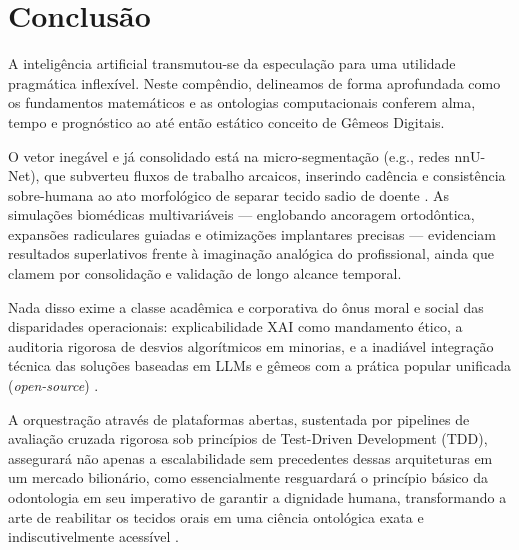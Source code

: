 \section{Conclusão}
\label{sec:ia-conclusão}

A inteligência artificial transmutou-se da especulação para uma utilidade pragmática inflexível. Neste compêndio, delineamos de forma aprofundada como os fundamentos matemáticos e as ontologias computacionais conferem alma, tempo e prognóstico ao até então estático conceito de Gêmeos Digitais.

O vetor inegável e já consolidado está na micro-segmentação (e.g., redes nnU-Net), que subverteu fluxos de trabalho arcaicos, inserindo cadência e consistência sobre-humana ao ato morfológico de separar tecido sadio de doente \cite{duggal2026, elsaid2025digital}. As simulações biomédicas multivariáveis — englobando ancoragem ortodôntica, expansões radiculares guiadas \cite{li2024} e otimizações implantares precisas \cite{alshadidi2024} — evidenciam resultados superlativos frente à imaginação analógica do profissional, ainda que clamem por consolidação e validação de longo alcance temporal.

Nada disso exime a classe acadêmica e corporativa do ônus moral e social das disparidades operacionais: explicabilidade XAI como mandamento ético, a auditoria rigorosa de desvios algorítmicos em minorias, e a inadiável integração técnica das soluções baseadas em LLMs e gêmeos com a prática popular unificada (\textit{open-source}) \cite{robles2023}. 

A orquestração através de plataformas abertas, sustentada por pipelines de avaliação cruzada rigorosa sob princípios de Test-Driven Development (TDD), assegurará não apenas a escalabilidade sem precedentes dessas arquiteturas em um mercado bilionário, como essencialmente resguardará o princípio básico da odontologia em seu imperativo de garantir a dignidade humana, transformando a arte de reabilitar os tecidos orais em uma ciência ontológica exata e indiscutivelmente acessível \cite{infante2024, frota2025}.

